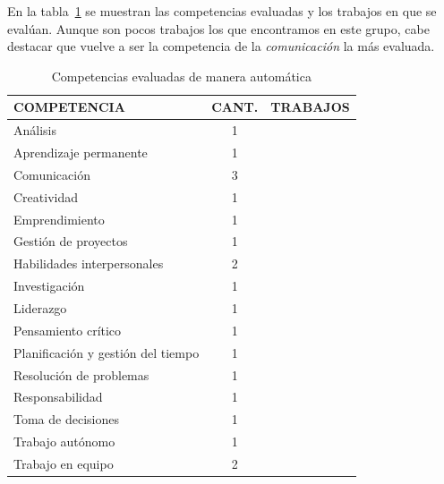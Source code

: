  En la tabla~\ref{tab:CompetenciasAutomaticas} se muestran las competencias evaluadas y los trabajos en que se evalúan. Aunque son pocos trabajos los que encontramos en este grupo, cabe destacar que vuelve a ser la competencia de la \emph{comunicación} la más evaluada.

\begin{table}
  \begin{center}
  \begin{tabular}{| m{6cm} | c | m{5cm} |}
    \hline
    COMPETENCIA & CANT. & TRABAJOS\\
    \hline
    \hline
    Análisis & 1 & \cite{andre2011formal} \\
    \hline
    Aprendizaje permanente & 1 & \cite{andre2011formal}   \\
    \hline
    Comunicación & 3 & \cite{andre2011formal,rayon2014web,bedek2011behavioral}  \\
    \hline
    Creatividad & 1 & \cite{andre2011formal}   \\
    \hline
    Emprendimiento & 1 & \cite{guenaga2013serious} \\
    \hline
    Gestión de proyectos & 1 & \cite{andre2011formal} \\
    \hline
    Habilidades interpersonales & 2 & \cite{andre2011formal,rayon2014web}  \\
    \hline
    Investigación & 1 & \cite{andre2011formal}  \\
    \hline
    Liderazgo & 1 & \cite{andre2011formal}  \\
    \hline
    Pensamiento crítico & 1 & \cite{andre2011formal} \\
    \hline
    Planificación y gestión del tiempo & 1 & \cite{andre2011formal} \\
    \hline
    Resolución de problemas & 1 & \cite{guenaga2013serious} \\
    \hline
    Responsabilidad & 1 & \cite{andre2011formal}  \\
    \hline 
    Toma de decisiones & 1 & \cite{andre2011formal}   \\
    \hline
    Trabajo autónomo & 1 & \cite{andre2011formal} \\
    \hline
    Trabajo en equipo & 2 & \cite{andre2011formal,fidalgo:2015}  \\
    \hline
  \end{tabular}
\end{center}
\caption{Competencias evaluadas de manera automática}
\label{tab:CompetenciasAutomaticas}
\end{table} 

